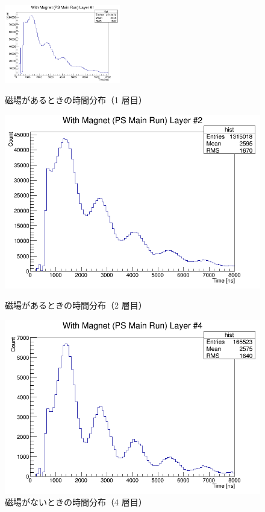 \begin{figure}[h]
	\centering
	\includegraphics[width = 0.45\textwidth]{figure/odagawa/PSgFactorDist_Layer0.png}
	\caption{磁場があるときの時間分布（1 層目）}
	\label{fig:PSgFactorDist_Layer0}
	\begin{minipage}{0.45\textwidth}
	\centering
	\includegraphics[width = \textwidth]{figure/odagawa/PSgFactorDist_Layer1.png}
	\caption{磁場があるときの時間分布（2 層目）}
	\label{fig:PSgFactorDist_Layer1}
	\end{minipage}
	\begin{minipage}{0.45\textwidth}
	\centering
	\includegraphics[width = \textwidth]{figure/odagawa/PSgFactorDist_Layer3.png}
	\caption{磁場がないときの時間分布（4 層目）}
	\label{fig:PSgFactorDist_Layer3}
	\end{minipage}
\end{figure}%

